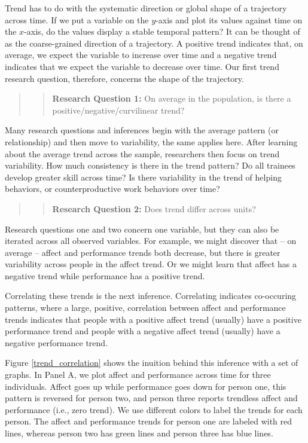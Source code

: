 \documentclass[english,,man]{apa6}
\begin{document}
Trend has to do with the systematic direction or global shape of a trajectory across time. If we put a variable on the \(y\)-axis and plot its values against time on the \(x\)-axis, do the values display a stable temporal pattern? It can be thought of as the coarse-grained direction of a trajectory. A positive trend indicates that, on average, we expect the variable to increase over time and a negative trend indicates that we expect the variable to decrease over time. Our first trend research question, therefore, concerns the shape of the trajectory.

\begin{quote}
\begin{quote}
\textbf{Research Question 1:} On average in the population, is there a positive/negative/curvilinear trend?
\end{quote}
\end{quote}

Many research questions and inferences begin with the average pattern (or relationship) and then move to variability, the same applies here. After learning about the average trend across the sample, researchers then focus on trend variability. How much consistency is there in the trend pattern? Do all trainees develop greater skill across time? Is there variability in the trend of helping behaviors, or counterproductive work behaviors over time?

\begin{quote}
\begin{quote}
\textbf{Research Question 2:} Does trend differ across units?
\end{quote}
\end{quote}

Research questions one and two concern one variable, but they can also be iterated across all observed variables. For example, we might discover that -- on average -- affect and performance trends both decrease, but there is greater variability across people in the affect trend. Or we might learn that affect has a negative trend while performance has a positive trend.

Correlating these trends is the next inference. Correlating indicates co-occuring patterns, where a large, positive, correlation between affect and performance trends indicates that people with a positive affect trend (usually) have a positive performance trend and people with a negative affect trend (usually) have a negative performance trend.

Figure \ref{trend_correlation} shows the inuition behind this inference with a set of graphs. In Panel A, we plot affect and performance across time for three individuals. Affect goes up while performance goes down for person one, this pattern is reversed for person two, and person three reports trendless affect and performance (i.e., zero trend). We use different colors to label the trends for each person. The affect and performance trends for person one are labeled with red lines, whereas person two has green lines and person three has blue lines.
\end{document}
